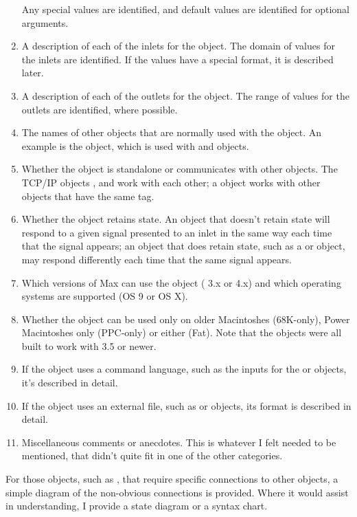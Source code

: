 \begin{enumerate}[  1)]
Any special values are identified, and default values are identified for optional arguments.
\item A description of each of the inlets for the object.
The domain of values for the inlets are identified.
If the values have a special format, it is described later.
\item A description of each of the outlets for the object.
The range of values for the outlets are identified, where possible.
\item The names of other objects that are normally used with the object.
An example is the  object, which is used with  and  objects.
\item Whether the object is standalone or communicates with other objects.
The TCP/IP objects ,  and  work with each other;
a  object works with other  objects that have the same tag.
\item Whether the object retains state.
An object that doesn't retain state will respond to a given signal presented to an inlet in the same way each time that
the signal appears;
an object that does retain state, such as a  or  object, may respond differently each time
that the same signal appears.
\item Which versions of Max can use the object (\MaxName{} 3.x or \MaxName{} 4.x) and which operating systems are supported (OS 9 or OS X).
\item Whether the object can be used only on older Macintoshes (68K-only), Power Macintoshes only (PPC-only) or either (Fat).
Note that the objects were all built to work with \MaxName{} 3.5 or newer.
\item If the object uses a command language, such as the inputs for the  or  objects, it's described in
detail.
\item If the object uses an external file, such as  or  objects, its format is described in detail.
\item Miscellaneous comments or anecdotes.
This is whatever I felt needed to be mentioned, that didn't quite fit in one of the other categories.
\end{enumerate}

For those objects, such as , that require specific connections to other objects, a simple diagram of the non-obvious
connections is provided.
Where it would assist in understanding, I provide a state diagram or a syntax chart.

